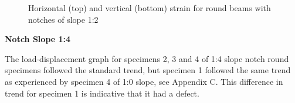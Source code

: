 \documentclass[11pt,a4paper]{article}
\numberwithin{equation}{subsection}
\begin{document}
\begin{figure}[h]
	\begin{center}
	\end{center}
	\caption{Horizontal (top) and vertical (bottom) strain for round beams with notches of slope 1:2}
	\label{fig:Round_12_ZY}
\end{figure}
\pagebreak

\noindent
\textbf{Notch Slope 1:4}\par
\noindent
The load-displacement graph for specimens 2, 3 and 4 of 1:4 slope notch round specimens followed the standard trend, but specimen 1 followed the same trend as experienced by specimen 4 of 1:0 slope, see Appendix C. This difference in trend for specimen 1 is indicative that it had a defect.
\end{document}
